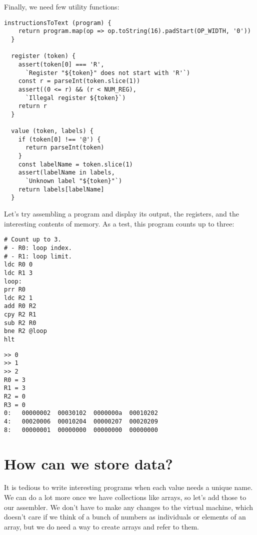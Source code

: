 \documentclass[krantzl]{krantz}
\begin{document}
Finally, we need few utility functions:


\begin{lstlisting}[frame=single,frameround=tttt]
  instructionsToText (program) {
    return program.map(op => op.toString(16).padStart(OP_WIDTH, '0'))
  }

  register (token) {
    assert(token[0] === 'R',
      `Register "${token}" does not start with 'R'`)
    const r = parseInt(token.slice(1))
    assert((0 <= r) && (r < NUM_REG),
      `Illegal register ${token}`)
    return r
  }

  value (token, labels) {
    if (token[0] !== '@') {
      return parseInt(token)
    }
    const labelName = token.slice(1)
    assert(labelName in labels,
      `Unknown label "${token}"`)
    return labels[labelName]
  }
\end{lstlisting}



Let's try assembling a program and display its output,
the registers,
and the interesting contents of memory.
As a test,
this program counts up to three:


\begin{lstlisting}[frame=single,frameround=tttt]
# Count up to 3.
# - R0: loop index.
# - R1: loop limit.
ldc R0 0
ldc R1 3
loop:
prr R0
ldc R2 1
add R0 R2
cpy R2 R1
sub R2 R0
bne R2 @loop
hlt
\end{lstlisting}



\begin{lstlisting}[frame=single,frameround=tttt]
>> 0
>> 1
>> 2
R0 = 3
R1 = 3
R2 = 0
R3 = 0
0:   00000002  00030102  0000000a  00010202
4:   00020006  00010204  00000207  00020209
8:   00000001  00000000  00000000  00000000
\end{lstlisting}


\section{How can we store data?}\label{virtual-machine-data}


It is tedious to write interesting programs when each value needs a unique name.
We can do a lot more once we have collections like arrays,
so let's add those to our assembler.
We don't have to make any changes to the virtual machine,
which doesn't care if we think of a bunch of numbers as individuals or elements of an array,
but we do need a way to create arrays and refer to them.
\end{document}
